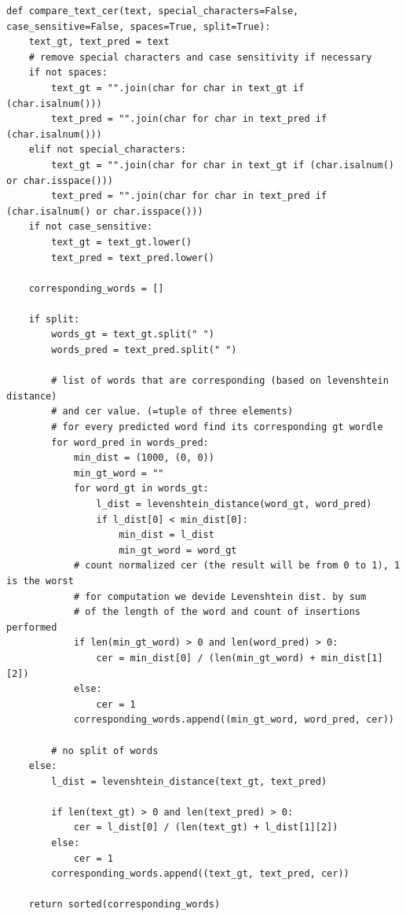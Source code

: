 

\begin{lstlisting}[caption=compare\_text\_cer]
def compare_text_cer(text, special_characters=False, case_sensitive=False, spaces=True, split=True):
    text_gt, text_pred = text
    # remove special characters and case sensitivity if necessary
    if not spaces:
        text_gt = "".join(char for char in text_gt if (char.isalnum()))
        text_pred = "".join(char for char in text_pred if (char.isalnum()))
    elif not special_characters:
        text_gt = "".join(char for char in text_gt if (char.isalnum() or char.isspace()))
        text_pred = "".join(char for char in text_pred if (char.isalnum() or char.isspace()))
    if not case_sensitive:
        text_gt = text_gt.lower()
        text_pred = text_pred.lower()
    
    corresponding_words = []

    if split:
        words_gt = text_gt.split(" ")
        words_pred = text_pred.split(" ")

        # list of words that are corresponding (based on levenshtein distance)
        # and cer value. (=tuple of three elements)
        # for every predicted word find its corresponding gt wordle
        for word_pred in words_pred:    
            min_dist = (1000, (0, 0))
            min_gt_word = ""                  
            for word_gt in words_gt: 
                l_dist = levenshtein_distance(word_gt, word_pred)
                if l_dist[0] < min_dist[0]:
                    min_dist = l_dist
                    min_gt_word = word_gt
            # count normalized cer (the result will be from 0 to 1), 1 is the worst
            # for computation we devide Levenshtein dist. by sum 
            # of the length of the word and count of insertions performed
            if len(min_gt_word) > 0 and len(word_pred) > 0:
                cer = min_dist[0] / (len(min_gt_word) + min_dist[1][2])
            else:
                cer = 1
            corresponding_words.append((min_gt_word, word_pred, cer))

        # no split of words    
    else:
        l_dist = levenshtein_distance(text_gt, text_pred)

        if len(text_gt) > 0 and len(text_pred) > 0:
            cer = l_dist[0] / (len(text_gt) + l_dist[1][2])
        else:
            cer = 1
        corresponding_words.append((text_gt, text_pred, cer))

    return sorted(corresponding_words)
\end{lstlisting}


